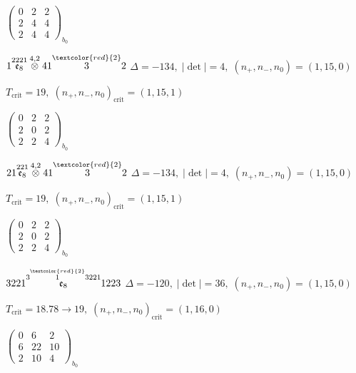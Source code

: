 \documentclass[10pt]{article}
\begin{document}
\hspace{2em}$\left(\begin{smallmatrix}0 & 2 & 2 \\ 2 & 4 & 4 \\ 2 & 4 & 4\end{smallmatrix}\right)_{\!b_0}$

\smallskip

$1\overset{2221}{\mathfrak{e}_8}\overset{4,2}{\otimes}41\overset{\textcolor{red}{2}}{3}2$ \quad $\Delta=-134,\; |\det|=4,\; (n_+,n_-,n_0)=(1,15,0)$

\hspace{1em}$T_{\text{crit}}=19,\; (n_+,n_-,n_0)_{\text{crit}}=(1,15,1)$

\hspace{2em}$\left(\begin{smallmatrix}0 & 2 & 2 \\ 2 & 0 & 2 \\ 2 & 2 & 4\end{smallmatrix}\right)_{\!b_0}$

\smallskip

$21\overset{221}{\mathfrak{e}_8}\overset{4,2}{\otimes}41\overset{\textcolor{red}{2}}{3}2$ \quad $\Delta=-134,\; |\det|=4,\; (n_+,n_-,n_0)=(1,15,0)$

\hspace{1em}$T_{\text{crit}}=19,\; (n_+,n_-,n_0)_{\text{crit}}=(1,15,1)$

\hspace{2em}$\left(\begin{smallmatrix}0 & 2 & 2 \\ 2 & 0 & 2 \\ 2 & 2 & 4\end{smallmatrix}\right)_{\!b_0}$

\smallskip

$3221\overset{3\overset{\textcolor{red}{2}}{1}3221}{\mathfrak{e}_8}1223$ \quad $\Delta=-120,\; |\det|=36,\; (n_+,n_-,n_0)=(1,15,0)$

\hspace{1em}$T_{\text{crit}}=18.78 \to 19,\; (n_+,n_-,n_0)_{\text{crit}}=(1,16,0)$

\hspace{2em}$\left(\begin{smallmatrix}0 & 6 & 2 \\ 6 & 22 & 10 \\ 2 & 10 & 4\end{smallmatrix}\right)_{\!b_0}$
\end{document}
